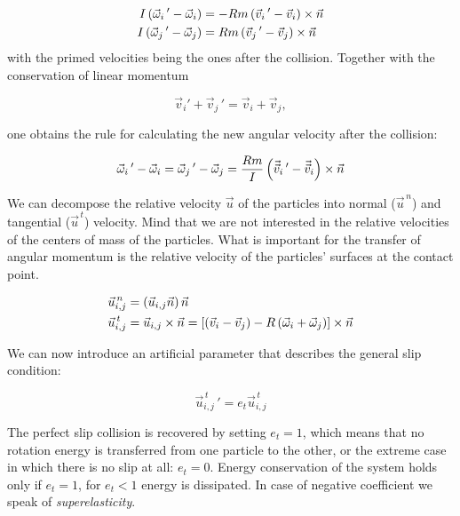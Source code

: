 \begin{align*}
I\left(\vec{\omega}_i\,'-\vec{\omega}_i\right) &= -R m \left(\vec{v}_i\,'-\vec{v}_i\right)\times\vec{n}\\
I\left(\vec{\omega}_j\,'-\vec{\omega}_j\right) &=  R m \left(\vec{v}_j\,'-\vec{v}_j\right)\times\vec{n}
\end{align*}
with the primed velocities being the ones after the collision. Together with the conservation of linear momentum

\begin{equation*}
\vec{v}_i'+\vec{v}_j\,' = \vec{v}_i+\vec{v}_j,
\end{equation*}

one obtains the rule for calculating the new angular velocity after the collision: 

\begin{equation}
\vec{\omega}_i\,'-\vec{\omega}_i = \vec{\omega}_j\,'-\vec{\omega}_j = \frac{R m}{I} \left(\vec{\vec{v}}_i\,'-\vec{\vec{v}}_i\right) \times \vec{n}
\label{eq:ang_vel_diff}
\end{equation}

We can decompose the relative velocity $\vec{u}$ of the particles into normal ($\vec{u}^{\,n}$) and tangential ($\vec{u}^{\,t}$) velocity. Mind that we are not interested in the relative velocities of the centers of mass of the particles. What is important for the transfer of angular momentum is the relative velocity of the particles' surfaces at the contact point.
 
\begin{align*}
\vec{u}_{i,j}^{\,n} &= \left(\vec{u}_{i,j} \vec{n}\right) \vec{n}  \\
\vec{u}_{i,j}^{\,t} &= \vec{u}_{i,j} \times \vec{n} = \left[\left(\vec{v}_{i}-\vec{v}_{j}\right) - R\left(\vec{\omega}_{i}+\vec{\omega}_{j}\right)\right]\times\vec{n}
\end{align*}

We can now introduce an artificial parameter that describes the general slip condition:

\begin{equation}
\vec{u}_{i,j}^{\,t}\,' = e_t \vec{u}_{i,j}^{\,t} 
\label{eq:slipc}
\end{equation}


The perfect slip collision is recovered by setting  $e_t=1$, which means that no rotation energy is transferred from one particle to the other, or the extreme case in which there is no slip at all: $e_t=0$. Energy conservation of the system holds only if $e_t=1$, for $ e_t<1$ energy is dissipated. In case of negative coefficient we speak of \emph{superelasticity}.

